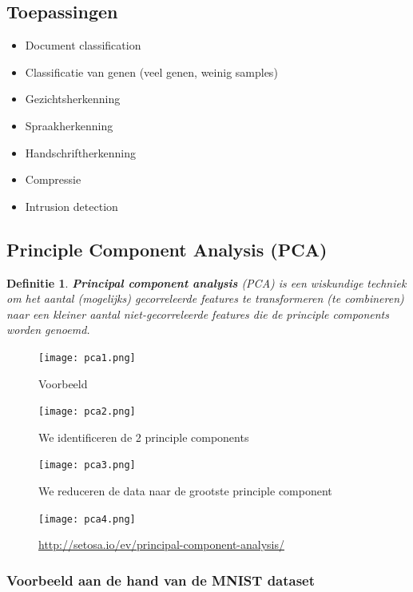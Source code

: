 \documentclass{article}
\newtheorem{theorem}{Definitie}[section]
\begin{document}
\subsection{Toepassingen}

\begin{itemize}
    \item Document classification
    \item Classificatie van genen (veel genen, weinig samples)
    \item Gezichtsherkenning
    \item Spraakherkenning
    \item Handschriftherkenning
    \item Compressie
    \item Intrusion detection
\end{itemize}

\subsection{Principle Component Analysis (PCA)}

\begin{theorem}
    \textbf{Principal component analysis} (PCA) is een wiskundige techniek om het aantal (mogelijks)
    gecorreleerde features te transformeren (te combineren) naar een kleiner aantal niet-gecorreleerde features
    die de principle components worden genoemd.
\end{theorem}


\begin{figure}[H]
    \centering
    \texttt{[image: pca1.png]}
    \caption{Voorbeeld}
\end{figure}

\begin{figure}[H]
    \centering
    \texttt{[image: pca2.png]}
    \caption{We identificeren de 2 principle components}
\end{figure}

\begin{figure}[H]
    \centering
    \texttt{[image: pca3.png]}
    \caption{We reduceren de data naar de grootste principle component}
\end{figure}

\begin{figure}[H]
    \centering
    \texttt{[image: pca4.png]}
    \caption{\url{http://setosa.io/ev/principal-component-analysis/}}
\end{figure}

\subsubsection{Voorbeeld aan de hand van de MNIST dataset}
\end{document}
